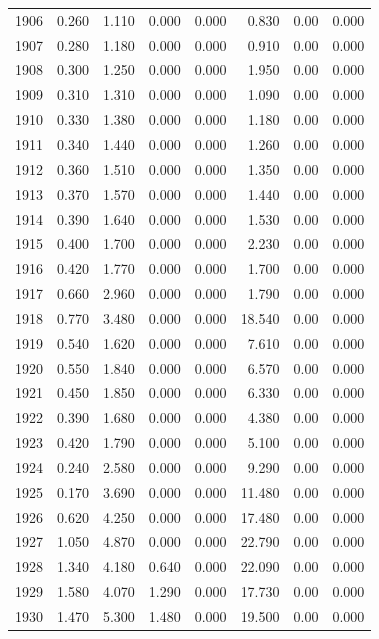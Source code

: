 \documentclass[
]{scrartcl}
\begin{document}
\begin{longtable}{rrrrrrrr}
1906 & 0.260 & 1.110 & 0.000 & 0.000 & 0.830 & 0.00 & 0.000 \\ 
1907 & 0.280 & 1.180 & 0.000 & 0.000 & 0.910 & 0.00 & 0.000 \\ 
1908 & 0.300 & 1.250 & 0.000 & 0.000 & 1.950 & 0.00 & 0.000 \\ 
1909 & 0.310 & 1.310 & 0.000 & 0.000 & 1.090 & 0.00 & 0.000 \\ 
1910 & 0.330 & 1.380 & 0.000 & 0.000 & 1.180 & 0.00 & 0.000 \\ 
1911 & 0.340 & 1.440 & 0.000 & 0.000 & 1.260 & 0.00 & 0.000 \\ 
1912 & 0.360 & 1.510 & 0.000 & 0.000 & 1.350 & 0.00 & 0.000 \\ 
1913 & 0.370 & 1.570 & 0.000 & 0.000 & 1.440 & 0.00 & 0.000 \\ 
1914 & 0.390 & 1.640 & 0.000 & 0.000 & 1.530 & 0.00 & 0.000 \\ 
1915 & 0.400 & 1.700 & 0.000 & 0.000 & 2.230 & 0.00 & 0.000 \\ 
1916 & 0.420 & 1.770 & 0.000 & 0.000 & 1.700 & 0.00 & 0.000 \\ 
1917 & 0.660 & 2.960 & 0.000 & 0.000 & 1.790 & 0.00 & 0.000 \\ 
1918 & 0.770 & 3.480 & 0.000 & 0.000 & 18.540 & 0.00 & 0.000 \\ 
1919 & 0.540 & 1.620 & 0.000 & 0.000 & 7.610 & 0.00 & 0.000 \\ 
1920 & 0.550 & 1.840 & 0.000 & 0.000 & 6.570 & 0.00 & 0.000 \\ 
1921 & 0.450 & 1.850 & 0.000 & 0.000 & 6.330 & 0.00 & 0.000 \\ 
1922 & 0.390 & 1.680 & 0.000 & 0.000 & 4.380 & 0.00 & 0.000 \\ 
1923 & 0.420 & 1.790 & 0.000 & 0.000 & 5.100 & 0.00 & 0.000 \\ 
1924 & 0.240 & 2.580 & 0.000 & 0.000 & 9.290 & 0.00 & 0.000 \\ 
1925 & 0.170 & 3.690 & 0.000 & 0.000 & 11.480 & 0.00 & 0.000 \\ 
1926 & 0.620 & 4.250 & 0.000 & 0.000 & 17.480 & 0.00 & 0.000 \\ 
1927 & 1.050 & 4.870 & 0.000 & 0.000 & 22.790 & 0.00 & 0.000 \\ 
1928 & 1.340 & 4.180 & 0.640 & 0.000 & 22.090 & 0.00 & 0.000 \\ 
1929 & 1.580 & 4.070 & 1.290 & 0.000 & 17.730 & 0.00 & 0.000 \\ 
1930 & 1.470 & 5.300 & 1.480 & 0.000 & 19.500 & 0.00 & 0.000 \\ 

\end{longtable}
\end{document}
